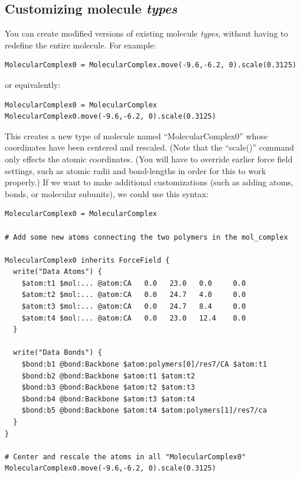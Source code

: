 \documentclass[11pt]{article}
\begin{document}
%


\subsection{Customizing molecule \textit{types}}
\label{sec:molecule_customization}
You can create modified versions of existing molecule \textit{types}, 
without having to redefine the entire molecule. For example:
\begin{verbatim}
MolecularComplex0 = MolecularComplex.move(-9.6,-6.2, 0).scale(0.3125)
\end{verbatim}
or equivalently:
\begin{verbatim}
MolecularComplex0 = MolecularComplex
MolecularComplex0.move(-9.6,-6.2, 0).scale(0.3125)
\end{verbatim}
This creates a new type of molecule named ``MolecularComplex0'' whose 
coordinates have been centered and rescaled.
(Note that the ``scale()'' command only effects the atomic coordinates.
(You will have to override earlier force field settings,
such as atomic radii and bond-lengths in order for this to work properly.)
If we want to make additional customizations
(such as adding atoms, bonds, or molecular subunits), we could use this syntax:
\begin{verbatim}
MolecularComplex0 = MolecularComplex

# Add some new atoms connecting the two polymers in the mol_complex

MolecularComplex0 inherits ForceField {
  write("Data Atoms") {
    $atom:t1 $mol:... @atom:CA   0.0   23.0   0.0     0.0
    $atom:t2 $mol:... @atom:CA   0.0   24.7   4.0     0.0
    $atom:t3 $mol:... @atom:CA   0.0   24.7   8.4     0.0
    $atom:t4 $mol:... @atom:CA   0.0   23.0   12.4    0.0
  }

  write("Data Bonds") {
    $bond:b1 @bond:Backbone $atom:polymers[0]/res7/CA $atom:t1
    $bond:b2 @bond:Backbone $atom:t1 $atom:t2
    $bond:b3 @bond:Backbone $atom:t2 $atom:t3
    $bond:b4 @bond:Backbone $atom:t3 $atom:t4
    $bond:b5 @bond:Backbone $atom:t4 $atom:polymers[1]/res7/ca
  }
}

# Center and rescale the atoms in all "MolecularComplex0"
MolecularComplex0.move(-9.6,-6.2, 0).scale(0.3125)
\end{verbatim}
\end{document}
